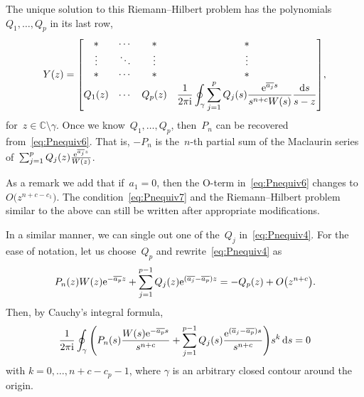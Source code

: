 \documentclass[pdftex]{sigma}
\numberwithin{equation}{section}
\newcommand*{\Cset}{\mathbb{C}} %
\begin{document}
 The unique solution to this Riemann--Hilbert problem has the polynomials~$Q_1, \dots, Q_p$ in its last row,
 \begin{equation*}
 Y(z)=
 \begin{bmatrix}	
 * & \cdots &*&*\\
 \vdots & \ddots & \vdots & \vdots\\
 * & \cdots &*&* \\
 Q_1(z)&\cdots& Q_p(z)& \displaystyle \frac{1}{2 \pi {\rm i}} \oint_\gamma \sum _{j=1}^pQ_j(s)\frac{{\rm e}^{\overline{a_j}s}}{s^{n+c} W(s)}\frac{{\rm d}s}{s-z}
 \end{bmatrix}\!,
 \end{equation*}
 for~$z \in \Cset \setminus \gamma$. Once we know~$Q_1, \dots, Q_p$, then~$P_n$ can be recovered from~\eqref{eq:Pnequiv6}. That is, $-P_n$ is the~$n$-th partial sum of the Maclaurin series of~$\sum_{j=1}^p Q_j(z) \frac{{\rm e}^{\overline{a_j} z}}{W(z)}$.

 As a remark we add that if~$a_1=0$, then the O-term in~\eqref{eq:Pnequiv6} changes to~$O\big(z^{n+c-c_1}\big)$. The condition~\eqref{eq:Pnequiv7} and the Riemann--Hilbert problem similar to the above can still be written after appropriate modifications.

 In a similar manner, we can single out one of the~$Q_j$ in~\eqref{eq:Pnequiv4}. For the ease of notation, let us choose~$Q_p$ and rewrite~\eqref{eq:Pnequiv4} as
 \begin{equation*}
 P_n(z) W(z) {\rm e}^{-\overline{a_p}z} + \sum_{j=1}^{p-1} Q_j(z) {\rm e}^{(\overline{a_j} - \overline{a_p})z} = - Q_p(z) + O\big(z^{n+c}\big).
 \end{equation*}
 Then, by Cauchy's integral formula,
 \begin{align}
 \label{eq:Pnequiv8}
 \frac{1}{2\pi {\rm i}} \oint _{\gamma} \Bigg(P_n(s) \frac{W(s) {\rm e}^{-\overline{a_p} s}}{s^{n+c}} + \sum_{j=1}^{p-1} Q_j(s) \frac{{\rm e}^{(\overline{a}_j-\overline{a_p}) s}}{s^{n+c}}\Bigg) s^k\, {\rm d}s=0
 \end{align}
 with $k=0, \dots, n+c-c_{p}-1$, where $\gamma$ is an arbitrary closed contour around the origin.
\end{document}

